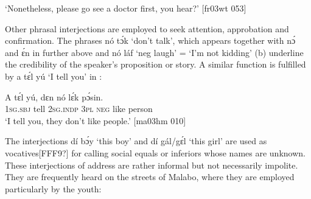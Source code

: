 \glt ‘Nonetheless, please go see a doctor first, you hear?’ [fr03wt 053]
\z


\ea%
    \label{ex:key:1659}
\z\z

Other phrasal interjections are employed to seek attention, approbation and confirmation. The phrases nó tɔ́k ‘don’t talk’, which appears together with nɔ́ and ɛ́n in  further above and nó láf ‘neg laugh’ = ‘I’m not kidding’ (b) underline the credibility of the speaker’s proposition or story. A similar function is fulfilled by a tɛ́l yú ‘I tell you’ in :


\ea%
    \label{ex:key:1660}
\z\z


\ea%
    \label{ex:key:1661}
    \gll A    tɛ́l  yú,    dɛn  nó  lɛ́k  pɔ́sin.\\
\textsc{1sg.sbj}  tell  \textsc{2sg.indp}  \textsc{3pl}  \textsc{neg}  like  person\\

\glt ‘I tell you, they don’t like people.’ [ma03hm 010]
\z

The interjections dí bɔ́y ‘this boy’ and dí gál/gɛ́l ‘this girl’ are used as vocatives[FFF9?] for calling social equals or inferiors whose names are unknown. These interjections of address are rather informal but not necessarily impolite. They are frequently heard on the streets of Malabo, where they are employed particularly by the youth: 


